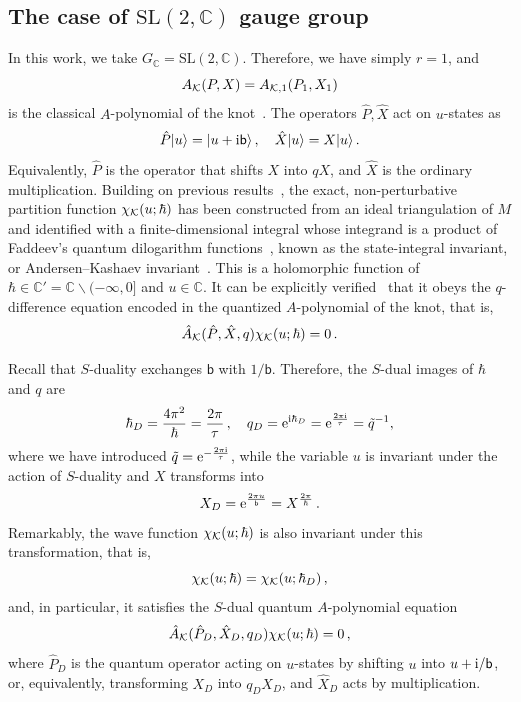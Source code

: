 \documentclass[a4paper,11pt]{article}
\theoremstyle{definition}
\newcommand{\CK}{{\cal K}}
\def\IC{{\mathbb C}}
\newcommand{\re}{{\rm e}}
\newcommand{\ri}{{\rm i}}
\def\tq{{\tilde{q}}}
\def\tq{{\tilde{q}}}
\newcommand{\mb}{{\mathsf{b}}}
\newcommand{\be}{\begin{equation}}
\newcommand{\ee}{\end{equation}}
\begin{document}
\subsection{The case of $\text{SL}(2,\IC)$ gauge group} \label{sec: sl2c}
In this work, we take $G_{\IC} = \text{SL}(2,\IC)$. Therefore, we have simply $r=1$, and 
\be
A_{\CK}(P,X)=A_{\CK, 1}(P_1,X_1)
\ee
is the classical $A$-polynomial of the knot~\cite{Cooper:1994aa}.
The operators $\hat{P}, \hat{X}$ act on $u$-states as
\be
\hat{P} |u\rangle = |u+ \ri \mb \rangle \, , \quad \hat{X} |u\rangle = X |u\rangle \, .
\ee
Equivalently, $\hat{P}$ is the operator that shifts $X$ into $q X$, and $\hat{X}$ is the ordinary multiplication.
Building on previous results~\cite{hikami01, hikami07, dglz}, the exact, non-perturbative partition function $\chi_{\CK}(u; \hbar)$ has been constructed from an ideal triangulation of $M$ and identified with a finite-dimensional integral whose integrand is a product of Faddeev’s quantum dilogarithm functions~\cite{faddeev}, known as the state-integral invariant, or Andersen--Kashaev invariant~\cite{ak, ak2, dimofte-rev}. This is a holomorphic function of $\hbar \in \IC' = \IC \backslash (-\infty, 0 ]$ and $u \in \IC$. It can be explicitly verified~\cite{amalusa} that it obeys the $q$-difference equation encoded in the quantized $A$-polynomial of the knot, that is, 
\be \label{AJ-eq}
\hat{A}_{\CK}(\hat{P}, \hat{X},q) \chi_{\CK}(u;\hbar) = 0 \, .
\ee

Recall that $S$-duality exchanges $\mb$ with $1/\mb$. Therefore, the $S$-dual images of $\hbar$ and $q$ are
\be
\hbar_D={4 \pi^2 \over \hbar} = \frac{2 \pi}{\tau} \, , \quad q_D= \re^{\ri \hbar_D} = \re^{\frac{2 \pi \ri}{\tau}}= \tilde q^{-1},
\ee
where we have introduced $\tq = \re^{-{2 \pi \ri \over \tau}}$, while the variable $u$ is invariant under the action of $S$-duality and $X$ transforms into 
\be
X_D = \re^{\frac{2 \pi u}{\mb}} = X^{2 \pi \over \hbar} \, .
\ee
Remarkably, the wave function $\chi_{\CK}(u;\hbar)$ is also invariant under this transformation, that is, 
\be
\chi_{\CK}(u;\hbar)=\chi_{\CK}(u;\hbar_D) \, ,
\ee
and, in particular, it satisfies the $S$-dual quantum $A$-polynomial equation
\be
\hat A_\CK(\hat{P}_D, \hat{X}_D, q_D)\chi_{\CK}(u;\hbar)=0 \, ,
\ee
where $\hat{P}_D$ is the quantum operator acting on $u$-states by shifting $u$ into $u + \ri/\mb$, or, equivalently, transforming $X_D$ into $q_D X_D$, and $\hat{X}_D$ acts by multiplication.
\end{document}

